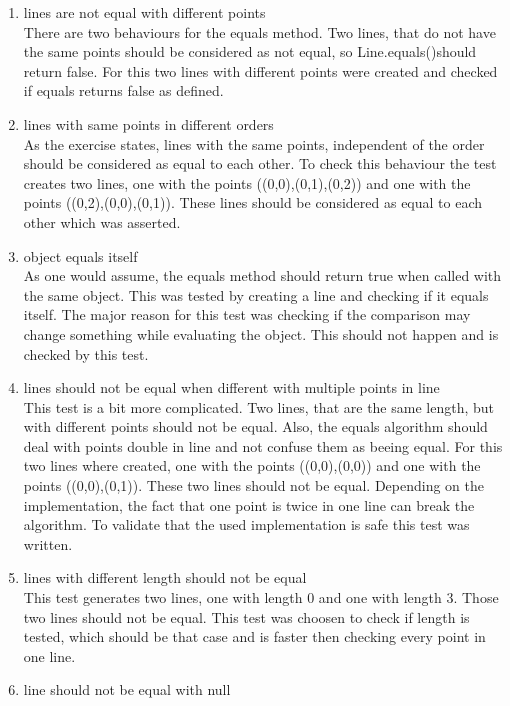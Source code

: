 \begin{enumerate}
    \item lines are not equal with different points \\
    There are two behaviours for the equals method. Two lines, that do not have the same points should be considered as not equal, so Line.equals()should return false. For this two lines with different points were created and checked if equals returns false as defined.
    \item lines with same points in different orders \\
    As the exercise states, lines with the same points, independent of the order should be considered as equal to each other. To check this behaviour the test creates two lines, one with the points ((0,0),(0,1),(0,2)) and one with the points ((0,2),(0,0),(0,1)). These lines should be considered as equal to each other which was asserted.
    \item object equals itself \\
    As one would assume, the equals method should return true when called with the same object. This was tested by creating a line and checking if it equals itself. The major reason for this test was checking if the comparison may change something while evaluating the object. This should not happen and is checked by this test.
    \item lines should not be equal when different with multiple points in line \\
    This test is a bit more complicated. Two lines, that are the same length, but with different points should not be equal. Also, the equals algorithm should deal with points double in line and not confuse them as beeing equal. For this two lines where created, one with the points ((0,0),(0,0)) and one with the points ((0,0),(0,1)). These two lines should not be equal. Depending on the implementation, the fact that one point is twice in one line can break the algorithm. To validate that the used implementation is safe this test was written.
    \item lines with different length should not be equal \\
    This test generates two lines, one with length 0 and one with length 3. Those two lines should not be equal. This test was choosen to check if length is tested, which should be that case and is faster then checking every point in one line.
    \item line should not be equal with null \\

\end{enumerate}
